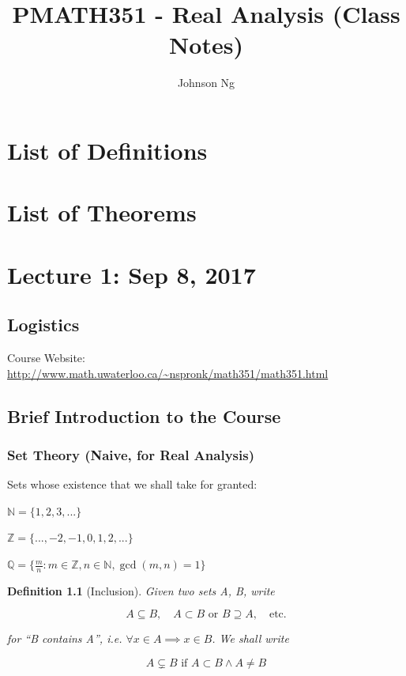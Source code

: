 \documentclass[11pt, oneside]{book}
\title{PMATH351 - Real Analysis (Class Notes)}
\author{Johnson Ng}
\theoremstyle{break}
\newtheorem{defn}{Definition}[section]
\newcommand{\bb}[1]{\mathbb{#1}}			%
\begin{document}
\hypersetup{pageanchor=false}
\maketitle
\hypersetup{pageanchor=true}
\tableofcontents

\chapter*{List of Definitions}

\chapter*{List of Theorems}

\chapter{Lecture 1: Sep 8, 2017}\label{chp:lec1}

\section{Logistics}

Course Website: \url{http://www.math.uwaterloo.ca/~nspronk/math351/math351.html}


\section{Brief Introduction to the Course}\label{sect:intro}

\subsection{Set Theory (Naive, for Real Analysis)}

Sets whose existence that we shall take for granted:

$\bb{N} = \{1, 2, 3, ...\}$

$\bb{Z} = \{..., -2, -1, 0, 1, 2, ...\}$

$\bb{Q} = \{\frac{m}{n} : m \in \bb{Z}, n \in \bb{N}, \gcd(m,n) = 1\}$

\begin{defn}[Inclusion]
	Given two sets A, B, write

	\begin{equation}
		A \subseteq B, \quad A \subset B \text{ or } B \supseteq A, \quad \text{etc.}	
	\end{equation}

	for ``B contains A'', i.e. $\forall x \in A \implies x \in B$. We shall write

	\begin{equation}
		A \subsetneq B \text{ if } A \subset B \land A \neq B
	\end{equation}
\end{defn}
\end{document}
